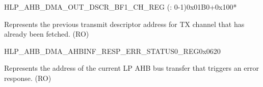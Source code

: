 \begin{register}{H}{LP\_AHB\_DMA\_OUT\_DSCR\_BF1\_CH\_REG (: 0-1)}{0x01B0+0x100*}\label{regdesc:LPAHBDMAOUTDSCRBF1CHNREG}
%
\regnewline%
\begin{regdesc}\begin{reglist}
\label{fielddesc:LPAHBDMAOUTLINKDSCRBF1CHN}\item [LP\_AHB\_DMA\_OUTLINK\_DSCR\_BF1\_CH\regindex{n}] Represents the previous transmit descriptor address for TX channel  that has already been fetched. (RO)
\end{reglist}\end{regdesc}
\end{register}


\begin{register}{H}{LP\_AHB\_DMA\_AHBINF\_RESP\_ERR\_STATUS0\_REG}{0x0620}\label{regdesc:LPAHBDMAAHBINFRESPERRSTATUS0REG}
%
\regnewline%
\begin{regdesc}\begin{reglist}
\label{fielddesc:LPAHBDMAAHBINFRESPERRADDR}\item [LP\_AHB\_DMA\_AHBINF\_RESP\_ERR\_ADDR] Represents the address of the current LP AHB bus transfer that triggers an error response. (RO)
\end{reglist}\end{regdesc}
\end{register}



